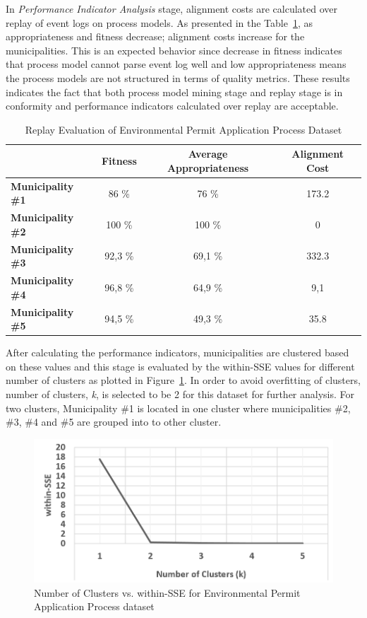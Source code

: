 In \textit{Performance Indicator Analysis} stage, alignment costs are calculated over replay of event logs on process models. As presented in the Table~\ref{table:coselog-wabo-replay}, as appropriateness and fitness decrease; alignment costs increase for the municipalities. This is an expected behavior since decrease in fitness indicates that process model cannot parse event log well and low appropriateness means the process models are not structured in terms of quality metrics. These results indicates the fact that both process model mining stage and replay stage is in conformity and performance indicators calculated over replay are acceptable.
\begin{table}[]
\centering
\caption{Replay Evaluation of Environmental Permit Application Process Dataset}
\label{table:coselog-wabo-replay}
\begin{tabular}{lccc}
\hline
 & {\bf Fitness} & {\bf Average Appropriateness} & {\bf Alignment Cost} \\ \hline
{\bf Municipality \#1} & 86 \% & 76 \% & 173.2 \\ \hline
{\bf Municipality \#2} & 100 \% & 100 \% & 0 \\ \hline
{\bf Municipality \#3} & 92,3 \% & 69,1 \% & 332.3 \\ \hline
{\bf Municipality \#4} & 96,8 \% & 64,9 \% & 9,1 \\ \hline
{\bf Municipality \#5} & 94,5 \% & 49,3 \% & 35.8 \\ \hline
\end{tabular}
\end{table}

After calculating the performance indicators, municipalities are clustered based on these values and this stage is evaluated by the within-SSE values for different number of clusters as plotted in Figure~\ref{fig:coselog-wabo-cluster-sse-plot}. In order to avoid overfitting of clusters, number of clusters, \textit{k}, is selected to be 2 for this dataset for further analysis. For two clusters, Municipality \#1 is located in one cluster where municipalities \#2, \#3, \#4 and \#5 are grouped into to other cluster.
\begin{figure}
	\centering
	\includegraphics[width=.7\textwidth]{5_results_discussions/coselog-wabo/cluster-sse-plot}
	\caption{Number of Clusters vs. within-SSE for Environmental Permit Application Process dataset}
  \label{fig:coselog-wabo-cluster-sse-plot}
\end{figure}

